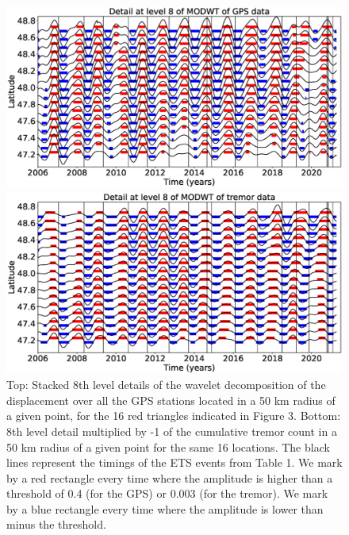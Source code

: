 \documentclass{article}
\begin{document}
\begin{figure}
\noindent\includegraphics[width=\textwidth, trim={0cm 0cm 0cm 0cm},clip]{figures/GPS_longer_detail_8.eps}

\noindent\includegraphics[width=\textwidth, trim={0cm 0cm 0cm 0cm},clip]{figures/tremor_longer_detail_8.eps}
\caption{Top: Stacked 8th level details of the wavelet decomposition of the displacement over all the GPS stations located in a 50 km radius of a given point, for the 16 red triangles indicated in Figure 3. Bottom: 8th level detail multiplied by -1 of the cumulative tremor count in a 50 km radius of a given point for the same 16 locations. The black lines represent the timings of the ETS events from Table 1. We mark by a red rectangle every time where the amplitude is higher than a threshold of 0.4 (for the GPS) or 0.003 (for the tremor). We mark by a blue rectangle every time where the amplitude is lower than minus the threshold.}
\label{pngfiguresample}
\end{figure}
\end{document}

